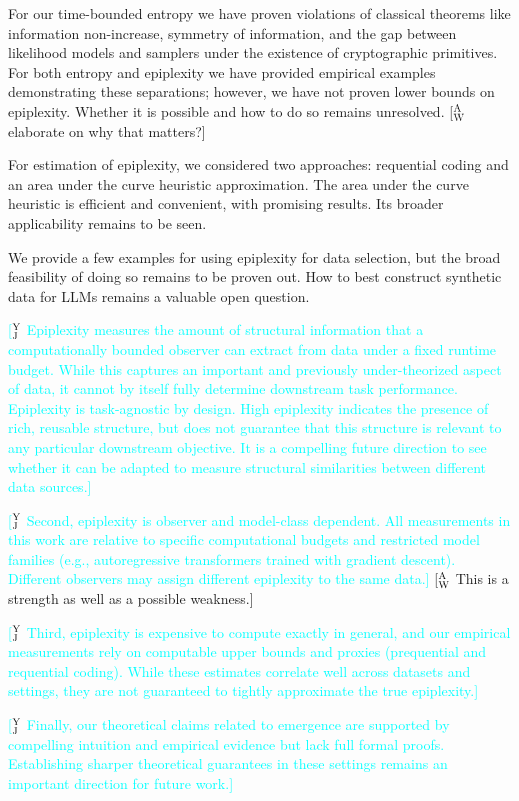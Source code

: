 \documentclass[twoside]{article}
\newcommand{\xxcomment}[4]{\textcolor{#1}{[$^{\textsc{#2}}_{\textsc{#3}}$ #4]}}
\newcommand{\agw}[1]{\xxcomment{amber}{A}{W}{#1}}
\newcommand{\yj}[1]{\xxcomment{cyan}{Y}{J}{#1}}
\begin{document}
For our time-bounded entropy we have proven violations of classical theorems like information non-increase, symmetry of information, and the gap between likelihood models and samplers under the existence of cryptographic primitives. For both entropy and epiplexity we have provided empirical examples demonstrating these separations; however, we have not proven lower bounds on epiplexity. Whether it is possible and how to do so remains unresolved. \agw{elaborate on why that matters?}

For estimation of epiplexity, we considered two approaches: requential coding and an area under the curve heuristic approximation. The area under the curve heuristic is efficient and convenient, with promising results. Its broader applicability remains to be seen.

We provide a few examples for using epiplexity for data selection, but the broad feasibility of doing so remains to be proven out. How to best construct synthetic data for LLMs remains a valuable open question.

\yj{Epiplexity measures the amount of structural information that a computationally bounded observer can extract from data under a fixed runtime budget. While this captures an important and previously under-theorized aspect of data, it cannot by itself fully determine downstream task performance.
Epiplexity is task-agnostic by design. High epiplexity indicates the presence of rich, reusable structure, but does not guarantee that this structure is relevant to any particular downstream objective. It is a compelling future direction to see whether it can be adapted to measure structural similarities between different data sources.}

\yj{Second, epiplexity is observer and model-class dependent. All measurements in this work are relative to specific computational budgets and restricted model families (e.g., autoregressive transformers trained with gradient descent). Different observers may assign different epiplexity to the same data.} \agw{This is a strength as well as a possible weakness.}

\yj{Third, epiplexity is expensive to compute exactly in general, and our empirical measurements rely on computable upper bounds and proxies (prequential and requential coding). While these estimates correlate well across datasets and settings, they are not guaranteed to tightly approximate the true epiplexity.}

\yj{Finally, our theoretical claims related to emergence are supported by compelling intuition and empirical evidence but lack full formal proofs. Establishing sharper theoretical guarantees in these settings remains an important direction for future work.}
\end{document}
